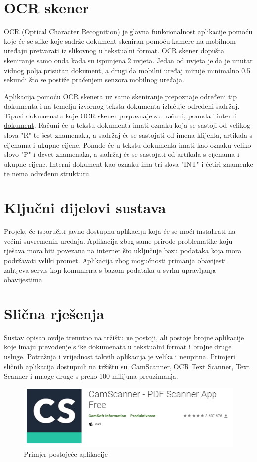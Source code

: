 		\section{OCR skener}
		OCR (Optical Character Recognition) je glavna funkcionalnost aplikacije pomoću koje će se slike koje sadrže dokument skeniran pomoću kamere na mobilnom uređaju pretvarati iz slikovnog u tekstualni format. OCR skener dopušta skeniranje samo onda kada su ispunjena 2 uvjeta. Jedan od uvjeta je da je unutar vidnog polja prisutan dokument, a drugi da mobilni uređaj miruje minimalno 0.5 sekundi što se postiže praćenjem senzora mobilnog uređaja.
		\par
		Aplikacija pomoću OCR skenera uz samo skeniranje prepoznaje određeni tip dokumenta i na temelju izvornog teksta dokumenta izlučuje određeni sadržaj. Tipovi dokumenata koje OCR skener prepoznaje su: \underline{računi}, \underline{ponuda} i \underline{interni dokument}. Računi će u tekstu dokumenta imati oznaku koja se sastoji od velikog slova "R" te šest znamenaka, a sadržaj će se sastojati od imena klijenta, artikala s cijenama i ukupne cijene. Ponude će u tekstu dokumenta imati kao oznaku veliko slovo "P" i devet znamenaka, a sadržaj će se sastojati od artikala s cijenama i ukupne cijene. Interni dokument kao oznaku ima tri slova "INT" i četiri znamenke te nema određenu strukturu.
		
		\section{Ključni dijelovi sustava}
		Projekt će isporučiti javno dostupnu aplikaciju koja će se moći instalirati na većini suvremenih uređaja. Aplikacija zbog same prirode problematike koju rješava mora biti povezana na internet što uključuje bazu podataka koja mora podržavati veliki promet. Aplikacija zbog mogućnosti primanja obavijesti zahtjeva servis koji komunicira s bazom podataka u svrhu upravljanja obavijestima.
		

		\section{Slična rješenja}
		Sustav opisan ovdje trenutno na tržištu ne postoji, ali postoje brojne aplikacije koje imaju prevođenje slike dokumenata u tekstualni format i brojne druge usluge. Potražnja i vrijednost takvih aplikacija je velika i neupitna. Primjeri sličnih aplikacija dostupnih na tržištu su: CamScanner, OCR Text Scanner, Text Scanner i mnoge druge s preko 100 milijuna preuzimanja.
		\begin{figure}[H]
			\includegraphics[scale=0.7]{slike/CamScanner} %
			\centering
			\caption{ Primjer postojeće aplikacije}
			\label{fig:promjene}
		\end{figure}
		
	